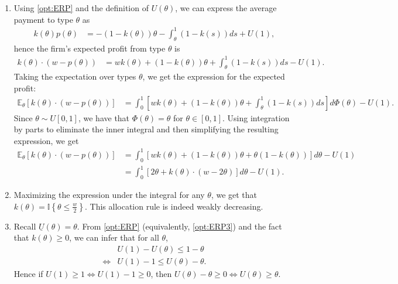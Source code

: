 \documentclass[a4paper]{article}
\begin{document}
\begin{enumerate}
	\item Using \eqref{opt:ERP} and the definition of $U(\theta)$, we can express the average payment to type $\theta$ as
	\begin{align}
		\label{opt:ERP1}
		k(\theta)p(\theta) &= -(1-k(\theta)) \theta - \int_{\theta}^{1} (1-k(s)) ds + U(1),
	\end{align}
	hence the firm's expected profit from type $\theta$ is
	\begin{align*}
		k(\theta)\cdot (w-p(\theta)) &= wk(\theta) + (1-k(\theta)) \theta + \int_{\theta}^{1} (1-k(s)) ds - U(1).
	\end{align*}
	Taking the expectation over types $\theta$, we get the expression for the expected profit:
	\begin{align*}
		\mathbb{E}_\theta [k(\theta)\cdot (w-p(\theta))] &= \int_0^1 \left[ wk(\theta) + (1-k(\theta)) \theta + \int_{\theta}^{1} (1-k(s)) ds \right] d\Phi(\theta) - U(1).
	\end{align*}
	Since $\theta \sim U[0,1]$, we have that $\Phi(\theta) = \theta$ for $\theta \in [0,1]$. Using integration by parts to eliminate the inner integral and then simplifying the resulting expression, we get
	\begin{align*}
		\mathbb{E}_\theta [k(\theta)\cdot (w-p(\theta))] &= \int_0^1 \left[ wk(\theta) + (1-k(\theta)) \theta + \theta (1-k(\theta)) \right] d\theta - U(1)
		\\
		&= \int_0^1 \left[ 2\theta + k(\theta) \cdot (w - 2\theta ) \right] d\theta - U(1).
	\end{align*}
	
	\item Maximizing the expression under the integral for any $\theta$, we get that $k(\theta) = \mathbb{I}\left\{ \theta \leq \frac{w}{2} \right\}$. This allocation rule is indeed weakly decreasing.
	
	\item Recall $\underline{U}(\theta)=\theta$. From \eqref{opt:ERP} (equivalently, \eqref{opt:ERP3}) and the fact that $k(\theta) \geq 0$, we can infer that for all $\theta$,
	\begin{align*}
		&U(1) - U(\theta) \leq 1-\theta
		\\
		\Leftrightarrow &U(1) - 1 \leq U(\theta) - \theta.
	\end{align*}
	Hence if $U(1)\geq 1 \iff U(1)-1 \geq 0$, then $U(\theta)-\theta \geq 0 \iff U(\theta) \geq \theta$.
	

\end{enumerate}
\end{document}

